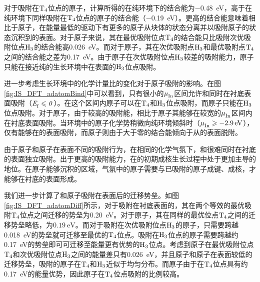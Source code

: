 对于吸附在$\rm T_{4} \it$位点的原子，计算所得的在纯环境下的结合能为\SI{-0.48}{\electronvolt}，高于在纯环境下同样吸附在$\rm T_{4} \it$位点的原子的结合能（\SI{-0.19}{\electronvolt}）。更高的结合能意味着相比于原子，在能量最低的驱动下有更多的原子从块体的状态分离并以吸附原子的状态沉积到的表面。对于原子来说，其在最优吸附位点$\rm T_{4} \it$的结合能只比吸附次优吸附位点$\rm H_{3} \it$的结合能高\SI{0.026}{\electronvolt}。而对于原子，其在次优吸附点$\rm H_{3} \it$和最优吸附点$\rm T_{4} \it$之间的结合能之差为\SI{0.17}{\electronvolt}。由于原子在次优吸附位点$\rm H_{3} \it$较差的吸附能力，原子只能在接近纯的生长环境中在表面的$\rm H_{3} \it$位点吸附。

进一步考虑生长环境中的化学计量比的变化对于原子吸附的影响。在图\ref{fig:IS_DFT_adatomBind}中可以看到，只有很小的$\it \mu_{\rm In}^{\rm } \it$区间允许和同时在衬底表面吸附（$\it E_{\rm f}^{\rm } \it \leqslant 0$）。在这个区间内原子可以在$\rm T_{4} \it$和$\rm H_{3} \it$位点吸附，而原子只能在$\rm H_{3} \it$位点吸附。对于原子，由于较高的吸附能，相比于原子其能够在较宽的$\it \mu_{\rm In}^{\rm } \it$区间内在衬底表面吸附。当环境中的原子化学势稍微向纯环境倾斜时（$\it \mu_{\rm In}^{\rm } \it\geqslant \SI{-2.9}{\electronvolt}$），仅有能够在的表面吸附，而原子则由于大于零的结合能倾向于从的表面脱附。

由于原子和原子在表面不同的吸附行为，在相同的化学气氛下，和很难同时在衬底的表面独立吸附。出于更高的吸附能力，在的初期成核生长过程中处于更加主导的地位。在原子能够沉积的区域，气氛中的原子需要与已吸附的原子成键、成核，才能够在衬底的表面形成。

我们进一步计算了和原子吸附在表面后的迁移势垒。如图\ref{fig:IS_DFT_adatomDiff}所示，对于吸附在衬底表面的，其在两个等效的最优吸附$\rm T_{4} \it$位点之间迁移的势垒为\SI{0.20}{\electronvolt}。对于原子，其在同样的最优位点$\rm T_{4} \it$之间的迁移势垒略低，为$\SI{0.19}{\electronvolt}$。而对于吸附在次优吸附位点$\rm H_{3} \it$的原子，只需要跨越\SI{0.018}{\electronvolt}的势垒就可迁移至最优的$\rm T_{4} \it$位点。吸附在$\rm H_{3} \it$位点的原子需要跨越约\SI{0.17}{\electronvolt}的势垒即可可迁移至能量更有优势的$\rm H_{3} \it$位点。考虑到原子在最优吸附位点$\rm T_{4} \it$和次优吸附位点$\rm H_{3} \it$之间的能量差只有\SI{0.026}{\electronvolt}，并且原子和原子在表面较低的迁移势垒，吸附的原子在$\rm T_{4} \it$和$\rm H_{3} \it$近似于均匀分布。而原子由于在$\rm T_{4} \it$位点具有约\SI{0.17}{\electronvolt}的能量优势，因此原子在$\rm T_{4} \it$位点吸附的比例较高。

